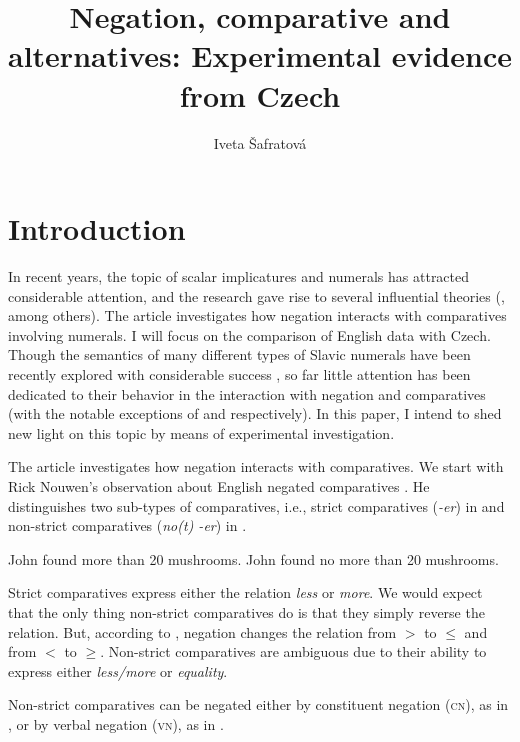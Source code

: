 \documentclass[output=paper,
]{langscibook}
\title{Negation, comparative and alternatives: Experimental evidence from Czech}
\author{
Iveta Šafratová\affiliation{Masaryk University in Brno}
}
\begin{document}
\maketitle


\section{Introduction} 

In recent years, the topic of scalar implicatures and numerals has attracted considerable attention, and the research gave rise to several influential theories (\citealt{larson1988scope,krifka1999least,sauerland2004scalar,fox2006universal}, among others). The article investigates how negation interacts with comparatives involving numerals. I will focus on the comparison of English data with Czech. Though the semantics of many different types of Slavic numerals have been recently explored with considerable success  \citep[e.g.][]{docekal2013numerals,wagiel2014boys,wagiel2015sums}, so far little attention has been dedicated to their behavior in the interaction with negation and comparatives (with the notable exceptions of \citealt{dovcekal2017upper} and \citealt{docekal_wagiel2018event} respectively). In this paper, I intend to shed new light on this topic by means of experimental investigation.

The article investigates how negation interacts with comparatives. We start with Rick Nouwen's observation about English negated comparatives \citep{nouwen2008upper}. He distinguishes two sub-types of comparatives, i.e., strict comparatives (\textit{-er}) in  and non-strict comparatives (\textit{no(t) -er}) in . 
	
\ea \ea John found more than 20 mushrooms.\label{ex:mush}
\ex John found no more than 20 mushrooms.\label{ex:no_mush}
\z
\z

\noindent Strict comparatives express either the relation \textit{less} or \textit{more}. We would expect that the only thing non-strict comparatives do is that they simply reverse the relation. 
But, according to \cite{nouwen2008upper}, negation
changes the relation from $>$ to $\leq$ and from $<$ to $\geq$. Non-strict comparatives are ambiguous due to
their ability to express either \textit{less/more} or \textit{equality}. 

Non-strict comparatives can be negated either by constituent negation (\textsc{cn}), as in , or by verbal negation (\textsc{vn}), as in .
\end{document}
